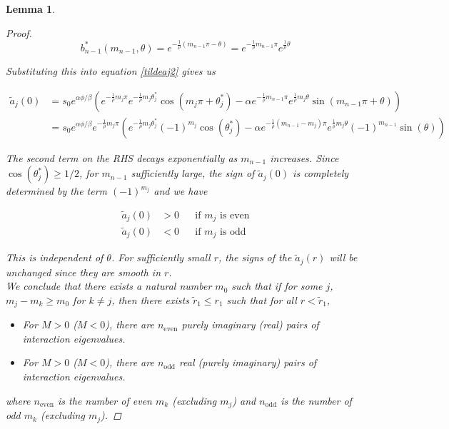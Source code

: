 \documentclass[12pt]{article}
\newtheorem{lemma}{Lemma}
\begin{document}
\begin{lemma}
\begin{proof}
\[
b^*_{n-1}(m_{n-1}, \theta) = e^{ -\frac{1}{\rho}(m_{n-1} \pi - \theta) } =
e^{ -\frac{1}{\rho}m_{n-1} \pi} e^{ \frac{1}{\rho}\theta }
\]

Substituting this into equation \eqref{tildeaj2} gives us

\begin{align*}
\tilde{a}_j(0) 
&= s_0 e^{\alpha \phi/\beta} \left( e^{ -\frac{1}{\rho} m_j \pi } e^{ -\frac{1}{\rho} m_j \theta^*_j } \cos\left( m_j \pi + \theta^*_j \right) - \alpha e^{ -\frac{1}{\rho} m_{n-1} \pi } e^{\frac{1}{\rho} m_j \theta } \sin \left( m_{n-1} \pi + \theta \right) \right) \\
&= s_0 e^{\alpha \phi/\beta} e^{ -\frac{1}{\rho} m_j \pi } \left(  e^{ -\frac{1}{\rho} m_j \theta^*_j } (-1)^{m_j} \cos(\theta^*_j) - \alpha e^{ -\frac{1}{\rho} (m_{n-1} - m_j) \pi } e^{\frac{1}{\rho} m_j \theta } (-1)^{m_{n-1}}\sin(\theta ) \right)  
\end{align*}

The second term on the RHS decays exponentially as $m_{n-1}$ increases. Since $\cos(\theta^*_j) \geq 1/2$, for $m_{n-1}$ sufficiently large, the sign of $\tilde{a}_j(0)$ is completely determined by the term $(-1)^{m_j}$ and we have

\begin{align*}
\tilde{a}_j(0) &> 0 && \text{if } m_j \text{ is even} \\
\tilde{a}_j(0) &< 0 && \text{if } m_j \text{ is odd}
\end{align*}

This is independent of $\theta$. For sufficiently small $r$, the signs of the $\tilde{a}_j(r)$ will be unchanged since they are smooth in $r$.\\

We conclude that there exists a natural number $m_0$ such that if for some $j$, $m_j - m_k \geq m_0$ for $k \neq j$, then there exists $\tilde{r}_1 \leq r_1$ such that for all $r < \tilde{r}_1$, 

\begin{itemize}
\item For $M > 0$ ($M < 0$), there are $n_{\text{even}}$ purely imaginary (real) pairs of interaction eigenvalues.
\item For $M > 0$ ($M < 0$), there are $n_{\text{odd}}$ real (purely imaginary) pairs of interaction eigenvalues.
\end{itemize}

where $n_{\text{even}}$ is the number of even $m_k$ (excluding $m_j$) and $n_{\text{odd}}$ is the number of odd $m_k$ (excluding $m_j$).

\end{proof}
\end{lemma}
\end{document}
